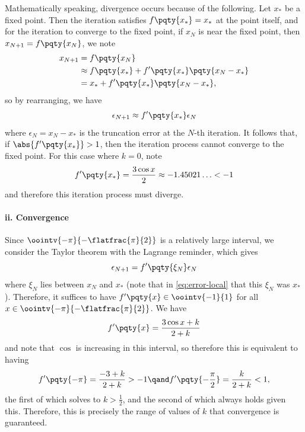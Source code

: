 \documentclass{article}
\begin{document}
Mathematically speaking, divergence occurs because of the following. Let \(x_{\ast}\) be a fixed point. Then the iteration satisfies \(f\pqty{x_\ast} = x_\ast\) at the point itself, and for the iteration to converge to the fixed point, if \(x_N\) is near the fixed point, then \(x_{N + 1} = f\pqty{x_N}\), we note
\begin{equation}
    \label{eq:divergence-proof}%
    \begin{aligned}
        x_{N + 1} &= f\pqty{x_N} \\
        &\approx f\pqty{x_{\ast}} + f'\pqty{x_{\ast}} \pqty{x_{N} - x_{\ast}} \\
        &= x_{\ast} + f'\pqty{x_{\ast}} \pqty{x_{N} - x_{\ast}},
    \end{aligned}
\end{equation}
so by rearranging, we have
\begin{equation}
    \label{eq:error-local}%
    \epsilon_{N + 1} \approx f'\pqty{x_{\ast}} \epsilon_{N}
\end{equation}
where \(\epsilon_N = x_N - x_{\ast}\) is the truncation error at the \(N\)-th iteration. It follows that, if \(\abs{f'\pqty{x_{\ast}}} > 1\), then the iteration process cannot converge to the fixed point. For this case where \(k = 0\), note
\begin{equation}
    f'\pqty{x_{\ast}} = \frac{3 \cos x}{2} \approx -1.45021\ldots < -1
\end{equation}
and therefore this iteration process must diverge.

\paragraph{ii. Convergence} Since \(\oointv{-\pi}{-\flatfrac{\pi}{2}}\) is a relatively large interval, we consider the Taylor theorem with the Lagrange reminder, which gives
\begin{equation}
    \label{eq:error-global}%
    \epsilon_{N + 1} = f'\pqty{\xi_N} \epsilon_N
\end{equation}
where \(\xi_N\) lies between \(x_N\) and \(x_{\ast}\) (note that in \autoref{eq:error-local} that this \(\xi_N\) was \(x_{\ast}\)). Therefore, it suffices to have \(f'\pqty{x} \in \oointv{-1}{1}\) for all \(x \in \oointv{-\pi}{-\flatfrac{\pi}{2}}\). We have
\begin{equation}
    f'\pqty{x} = \frac{3 \cos x + k}{2 + k}
\end{equation}
and note that \(\cos\) is increasing in this interval, so therefore this is equivalent to having
\begin{equation}
    f'\pqty{-\pi} = \frac{-3 + k}{2 + k} > -1 \qand f'\pqty{-\frac{\pi}{2}} = \frac{k}{2 + k} < 1,
\end{equation}
the first of which solves to \(\boxed{k > \frac{1}{2}}\), and the second of which always holds given this. Therefore, this is precisely the range of values of \(k\) that convergence is guaranteed.
\end{document}
